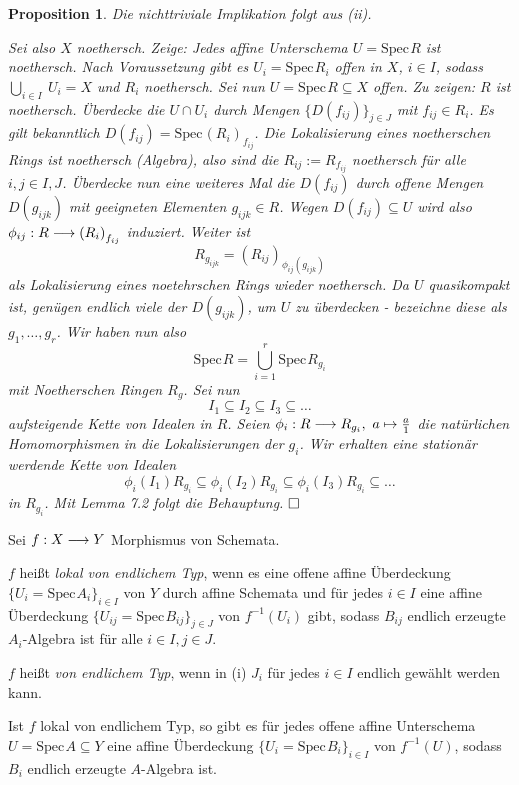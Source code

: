 \documentclass[11pt]{book}
\newtheorem{proposition}[theorem]{Proposition}
\theoremstyle{nonumberbreak}
\newenvironment{pr}[1][]{\ifthenelse{\equal{#1}{}}{\proof}{\proof[#1]}\rm}{\endproof}
\newenvironment{definprop}[1][]{\ifthenelse{\equal{#1}{}}{\definiprop}{\definiprop[#1]}\rm}{\enddefiniprop}
\newcommand{\spec}{\mathrm{Spec} \hspace{1pt} }
\begin{document}
\begin{spacing}{1.4}
\begin{proposition}
\begin{pr}
\comp
\item Die nichttriviale Implikation folgt aus (ii).
\item Sei also $X$ noethersch. Zeige: Jedes affine Unterschema $U = \spec R$ ist noethersch. Nach Voraussetzung gibt es $U_i = \spec R_i$ offen in $X$, $i \in I$, sodass $\bigcup_{i \in I} \ U_i = X$ und $R_i$ noethersch. Sei nun $U = \spec R \subseteq X$ offen. Zu zeigen: $R$ ist noethersch. Überdecke die $U \cap U_i$ durch Mengen $\{D(f_{ij})\}_{j \in J}$ mit $f_{ij} \in R_i$. Es gilt bekanntlich $D(f_{ij}) = \spec \left(R_i\right)_{f_{ij}}$. Die Lokalisierung eines noetherschen Rings ist noethersch (Algebra), also sind die $R_{ij} := R_{f_{ij}}$ noethersch für alle $i,j \in I,J$. Überdecke nun eine weiteres Mal die $D(f_{ij})$ durch offene Mengen $D(g_{ijk})$ mit geeigneten Elementen $g_{ijk} \in R$. Wegen $D(f_{ij}) \subseteq U$ wird also $\phi_{ij}: R \longrightarrow \left(R_i\right)_{f_{ij}}$ induziert. Weiter ist 
$$R_{g_{ijk}} = \left(R_{ij}\right)_{\phi_{ij}(g_{ijk})}$$
als Lokalisierung eines noetehrschen Rings wieder noethersch. Da $U$ quasikompakt ist, genügen endlich viele der $D(g_{ijk})$, um $U$ zu überdecken - bezeichne diese als $g_1, \ldots, g_r$. Wir haben nun also 
$$\spec R = \bigcup_{i=1}^r \spec R_{g_i}$$
mit Noetherschen Ringen $R_g$. Sei nun
$$I_1 \subseteq I_2 \subseteq I_3 \subseteq \ldots$$
aufsteigende Kette von Idealen in $R$. Seien $\phi_i: R \longrightarrow R_{g_i}, \ a \mapsto \frac{a}{1}$ die natürlichen Homomorphismen in die Lokalisierungen der $g_i$. Wir erhalten eine stationär werdende Kette von Idealen 
$$\phi_i (I_1) R_{g_i} \subseteq \phi_i(I_2) R_{g_i} \subseteq \phi_i(I_3) R_{g_i} \subseteq \ldots $$
in $R_{g_i}$. Mit Lemma 7.2 folgt die Behauptung. $\hfill \Box$

\cend
\end{pr}

\end{proposition}



\begin{definprop}
Sei $f: X \longrightarrow Y$ Morphismus von Schemata.
\comp
\item $f$ heißt \textit{lokal von endlichem Typ}, wenn es eine offene affine Überdeckung $\{U_i = \spec A_i\}_{i \in I}$ von $Y$ durch affine Schemata und für jedes $i \in I$ eine affine Überdeckung $\{U_{ij}= \spec B_{ij} \}_{j \in J}$ von $f^{-1}(U_i)$ gibt, sodass $B_{ij}$ endlich erzeugte $A_i$-Algebra ist für alle $i \in I, j \in J$.
\item $f$ heißt \textit{von endlichem Typ}, wenn in (i) $J_i$ für jedes $i \in I$ endlich gewählt werden kann.
\item Ist $f$ lokal von endlichem Typ, so gibt es für jedes offene affine Unterschema $U = \spec A \subseteq Y$ eine affine Überdeckung $\{U_{i} = \spec B_{i}\}_{i \in I}$ von $f^{-1}(U)$, sodass $B_{i}$ endlich erzeugte $A$-Algebra ist.
\cend


\end{definprop}
\end{spacing}
\end{document}
